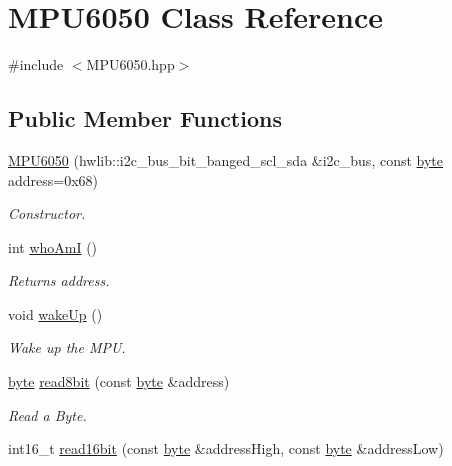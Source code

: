 \hypertarget{class_m_p_u6050}{}\section{M\+P\+U6050 Class Reference}
\label{class_m_p_u6050}


{\ttfamily \#include $<$M\+P\+U6050.\+hpp$>$}

\subsection*{Public Member Functions}
\begin{DoxyCompactItemize}
\item 
\mbox{\hyperlink{class_m_p_u6050_a5bb94c2ee72b6555f89fbd5b14dd0460}{M\+P\+U6050}} (hwlib\+::i2c\+\_\+bus\+\_\+bit\+\_\+banged\+\_\+scl\+\_\+sda \&i2c\+\_\+bus, const \mbox{\hyperlink{_m_p_u6050_8hpp_a71809484a26cd96c6abe839a0a8a289d}{byte}} address=0x68)
\begin{DoxyCompactList}\small\item\em Constructor. \end{DoxyCompactList}\item 
int \mbox{\hyperlink{class_m_p_u6050_a1b3f024861c18e17790ebb560d5bdd32}{who\+AmI}} ()
\begin{DoxyCompactList}\small\item\em Returns address. \end{DoxyCompactList}\item 
void \mbox{\hyperlink{class_m_p_u6050_a14d45cb8c0d8744bd280ca7d05e5d962}{wake\+Up}} ()
\begin{DoxyCompactList}\small\item\em Wake up the M\+PU. \end{DoxyCompactList}\item 
\mbox{\hyperlink{_m_p_u6050_8hpp_a71809484a26cd96c6abe839a0a8a289d}{byte}} \mbox{\hyperlink{class_m_p_u6050_a8eb2aeeb0c15bc5f756fc5c5ba958332}{read8bit}} (const \mbox{\hyperlink{_m_p_u6050_8hpp_a71809484a26cd96c6abe839a0a8a289d}{byte}} \&address)
\begin{DoxyCompactList}\small\item\em Read a Byte. \end{DoxyCompactList}\item 
int16\+\_\+t \mbox{\hyperlink{class_m_p_u6050_a4636841f6b3432d8d45726fcdcdcfed8}{read16bit}} (const \mbox{\hyperlink{_m_p_u6050_8hpp_a71809484a26cd96c6abe839a0a8a289d}{byte}} \&address\+High, const \mbox{\hyperlink{_m_p_u6050_8hpp_a71809484a26cd96c6abe839a0a8a289d}{byte}} \&address\+Low)

\end{DoxyCompactItemize}
